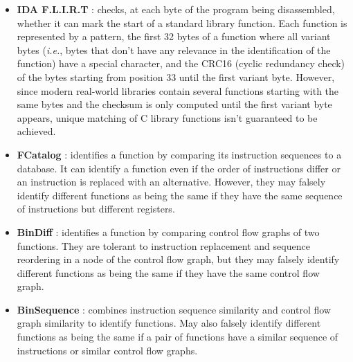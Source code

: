 \begin{itemize}
    \item \textbf{IDA F.L.I.R.T} \cite{hex2015idaflirt}: checks, at each byte of the program being disassembled, whether it can mark the start of a standard library function. Each function is represented by a pattern, the first 32 bytes of a function where all variant bytes (\textit{i.e.}, bytes that don't have any relevance in the identification of the function) have a special character, and the CRC16 (cyclic redundancy check) of the bytes starting from position 33 until the first variant byte. However, since modern real-world libraries contain several functions starting with the same bytes and the checksum is only computed until the first variant byte appears, unique matching of C library functions isn't guaranteed to be achieved.
    \item \textbf{FCatalog} \cite{xorpd2015fcatalog}: identifies a function by comparing its instruction sequences to a database. It can identify a function even if the order of instructions differ or an instruction is replaced with an alternative. However, they may falsely identify different functions as being the same if they have the same sequence of instructions but different registers.
    \item \textbf{BinDiff} \cite{dullien2005graph}: identifies a function by comparing control flow graphs of two functions. They are tolerant to instruction replacement and sequence reordering in a node of the control flow graph, but they may falsely identify different functions as being the same if they have the same control flow graph.
    \item \textbf{BinSequence} \cite{huang2017binsequence}: combines instruction sequence similarity and control flow graph similarity to identify functions. May also falsely identify different functions as being the same if a pair of functions have a similar sequence of instructions or similar control flow graphs. 
\end{itemize}

